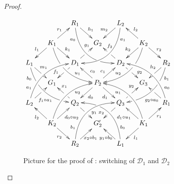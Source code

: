 \documentclass[a4paper,UKenglish,cleveref,pdftex,thm-restate,numberwithinsect,anonymous]{lipics}
\newcommand{\dder}[1]{\mathscr{#1}}
\begin{document}
\begin{proof}
	
	\begin{figure}[h]
		\centering 
		$\xymatrix@C=15pt@R=15pt{&&R_1 \ar@/_.8cm/[ddrr]_(.2){a_0}|(.7)\hole
			\ar[dr]^{h_1}&& L_2\ar@/^.8cm/[ddll]^(.2){a_1}
			\ar[dl]_{m_2}\\&K_1\ar[dr]^{k_1}\ar[dl]_{l_1}
			\ar@/_.6cm/[ddrr]|(.36)\hole^(.65){u_1}\ar[ur]^{r_1}&& G_2 &&
			K_2
			\ar@/^.6cm/[ddll]|(.36)\hole_(.65){u_2}\ar[dl]_{k_2}\ar[lu]_{l_2}
			\ar[dr]^{r_2}\\L_1
			\ar@/_.6cm/[ddrr]_(.2){b_0}|(.31)\hole|(.81)\hole
			\ar[dr]^(.4){m_1}|(.61)\hole && D_1
			\ar[dl]|(.4)\hole_(.65){f_1}\ar[ur]|(.5)\hole^(.7){g_1}&&D_2
			\ar[dr]|(.4)\hole^(.65){g_2}
			\ar[ul]|(.5)\hole_(.65){f_2}&&R_2\ar@/^.6cm/[ddll]^(.2){b_1}|(.31)\hole|(.81)\hole\ar[dl]_(.4){h_2}|(.61)\hole\\&G_1
			&&P_2\ar[dr]_{d_1}
			\ar[dl]^{d_0}\ar[ur]^(.4){c_1}\ar[ul]_(.4){c_0}&&G_3\\L_2
			\ar@/^.6cm/[uurr]^(.2){a_1} \ar[ur]_(.35){f_1\circ
				a_1}|(.61)\hole&&Q_2
			\ar[ul]|(.4)\hole_(.65){x_1}\ar[dr]|(.5)\hole^(.65){y_1}
			&&Q_3\ar[ur]|(.4)\hole^(.65){y_2} \ar[dl]|(.5)\hole_(.65){x_2}
			&& R_1 \ar[ul]^(.3){g_2\circ
				a_0}|(.61)\hole\ar@/_.6cm/[uull]_(.2){a_0}\\&K_2
			\ar[ur]_{d_0\circ u_2} \ar[dr]_{r_2}
			\ar[ul]^{l_2}\ar@/^.6cm/[uurr]_(.65){u_2}&&G'_2&& K_1
			\ar[ur]_{r_1} \ar[ul]^{d_1\circ u_1} \ar[dl]^{l_1}
			\ar@/_.6cm/[uull]^(.65){u_1}\\&& R_2
			\ar[ur]_{\hspace{-6pt}x_2\circ
				b_1}\ar@/^.8cm/[uurr]^(.2){b_1}&& L_1 \ar[ul]^{y_1\circ
				b_0\hspace{-7pt}} \ar@/_.8cm/[uull]_(.2){b_0} |(.69)\hole
		}	$		
		\caption{Picture for the proof of : switching of $\dder{D}_1$ and $\dder{D}_2$}
		\label{fi:second}
	\end{figure}
	

\end{proof}
\end{document}

